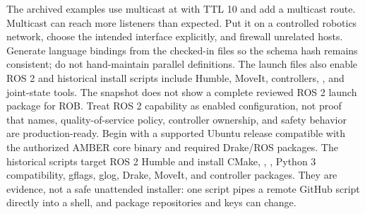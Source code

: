 {}\markdownRendererInterblockSeparator
{}The archived examples use multicast at  with TTL 10 and add a multicast route. Multicast can reach more listeners than expected. Put it on a controlled robotics network, choose the intended interface explicitly, and firewall unrelated hosts. Generate language bindings from the checked-in  files so the schema hash remains consistent; do not hand-maintain parallel definitions.\markdownRendererParagraphSeparator
{}The launch files also enable ROS 2 and historical install scripts include Humble, MoveIt, controllers, , and joint-state tools. The snapshot does not show a complete reviewed ROS 2 launch package for ROB. Treat ROS 2 capability as enabled configuration, not proof that names, quality-of-service policy, controller ownership, and safety behavior are production-ready.\markdownRendererInterblockSeparator
{}
\markdownRendererSectionEnd \markdownRendererSectionBegin
{}\markdownRendererInterblockSeparator
{}Begin with a supported Ubuntu release compatible with the authorized AMBER core binary and required Drake/ROS packages. The historical scripts target ROS 2 Humble and install CMake, , , Python 3 compatibility, gflags, glog, Drake, MoveIt, and controller packages. They are evidence, not a safe unattended installer: one script pipes a remote GitHub script directly into a shell, and package repositories and keys can change.\markdownRendererInterblockSeparator

